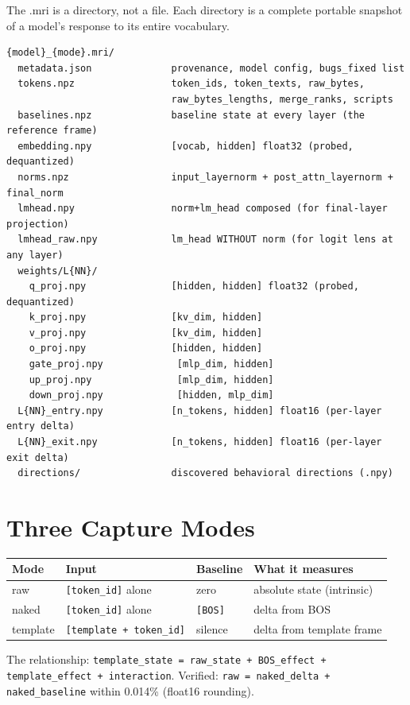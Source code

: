 \documentclass[11pt,a4paper]{report}
\begin{document}
The .mri is a directory, not a file. Each directory is a complete portable snapshot of a model's response to its entire vocabulary.

\begin{verbatim}
{model}_{mode}.mri/
  metadata.json              provenance, model config, bugs_fixed list
  tokens.npz                 token_ids, token_texts, raw_bytes,
                             raw_bytes_lengths, merge_ranks, scripts
  baselines.npz              baseline state at every layer (the reference frame)
  embedding.npy              [vocab, hidden] float32 (probed, dequantized)
  norms.npz                  input_layernorm + post_attn_layernorm + final_norm
  lmhead.npy                 norm+lm_head composed (for final-layer projection)
  lmhead_raw.npy             lm_head WITHOUT norm (for logit lens at any layer)
  weights/L{NN}/
    q_proj.npy               [hidden, hidden] float32 (probed, dequantized)
    k_proj.npy               [kv_dim, hidden]
    v_proj.npy               [kv_dim, hidden]
    o_proj.npy               [hidden, hidden]
    gate_proj.npy             [mlp_dim, hidden]
    up_proj.npy               [mlp_dim, hidden]
    down_proj.npy             [hidden, mlp_dim]
  L{NN}_entry.npy            [n_tokens, hidden] float16 (per-layer entry delta)
  L{NN}_exit.npy             [n_tokens, hidden] float16 (per-layer exit delta)
  directions/                discovered behavioral directions (.npy)
\end{verbatim}

\section{Three Capture Modes}

\begin{center}
\begin{tabular}{llll}
\toprule
\textbf{Mode} & \textbf{Input} & \textbf{Baseline} & \textbf{What it measures} \\
\midrule
raw & \texttt{[token\_id]} alone & zero & absolute state (intrinsic) \\
naked & \texttt{[token\_id]} alone & \texttt{[BOS]} & delta from BOS \\
template & \texttt{[template + token\_id]} & silence & delta from template frame \\
\bottomrule
\end{tabular}
\end{center}

The relationship: \texttt{template\_state = raw\_state + BOS\_effect + template\_effect + interaction}. Verified: \texttt{raw = naked\_delta + naked\_baseline} within 0.014\% (float16 rounding).
\end{document}
